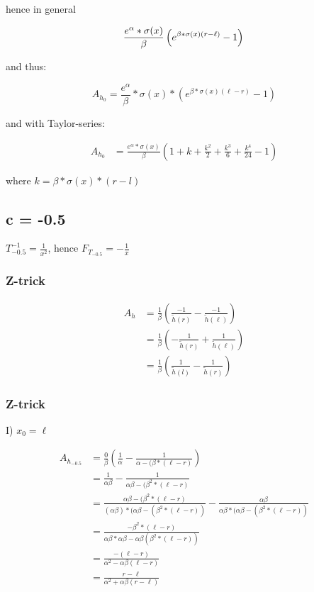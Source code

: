 \documentclass[]{article}
\begin{document}
hence in general

\[
	\frac{e^{\alpha} * \sigma(x)}{\beta} \left(e^{\beta * \sigma(x) (r - \ell)} - 1 \right) \\
\]

and thus:

\[
	A_{h_0} = \frac{e^{\alpha}}{\beta} * \sigma(x) * \left(e^{\beta * \sigma(x) (\ell - r)} - 1 \right)
\]

and with Taylor-series:

\begin{align*}
	A_{h_0} &= \frac{e^{\alpha} * \sigma(x)}{\beta} \left(1 + k + \frac{k^2}{2} +  \frac{k^3}{6} + \frac{k^4}{24} - 1 \right)
\end{align*}

where $k = \beta * \sigma(x) * (r - l)$

\subsection{c = -0.5}

$T_{-0.5}^{-1} = \frac{1}{x^2}$, hence $F_{T_{-0.5}} = - \frac{1}{x}$


\subsubsection{Z-trick}


\begin{align*}
A_h &= \frac{1}{\beta} \left(\frac{-1}{\tilde{h}(r)} - \frac{-1}{\tilde{h}(\ell)} \right) \\
& = \frac{1}{\beta} \left(- \frac{1}{\tilde{h}(r)} + \frac{1}{\tilde{h}(\ell)} \right) \\
& = \frac{1}{\beta} \left(\frac{1}{\tilde{h}(l)} - \frac{1}{\tilde{h}(r)} \right)
\end{align*}

\subsubsection{Z-trick}

I) $x_0 = \ell$

\begin{align*}
	A_{h_{-0.5}} & = \frac{0}{\beta} \left(\frac{1}{\alpha} - \frac{1}{\alpha - (\beta * (\ell - r)} \right) \\
	& = \frac{1}{\alpha \beta} - \frac{1}{\alpha \beta - (\beta^2 * (\ell - r)} \\
	& = \frac{\alpha \beta - (\beta^2 * (\ell - r)}{(\alpha \beta) * (\alpha \beta - (\beta^2 * (\ell - r))} - \frac{\alpha \beta}{\alpha \beta * ( \alpha \beta - (\beta^2 * (\ell - r))} \\
	& = \frac{-\beta^2 * (\ell - r)}{\alpha \beta * \alpha \beta - \alpha \beta (\beta^2 * (\ell - r))}\\
	& = \frac{-(\ell - r)}{\alpha^2 - \alpha \beta (\ell - r)}\\
	& = \frac{r - \ell}{\alpha^2 + \alpha \beta (r - \ell)}\\
\end{align*}
\end{document}
